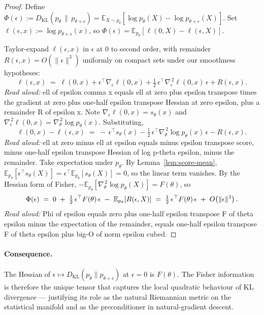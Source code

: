 \documentclass[11pt]{article}
\begin{document}
\begin{proof}
Define $\Phi(\epsilon) := D_{\mathrm{KL}}(p_\theta \,\|\, p_{\theta + \epsilon})
  = \mathbb{E}_{X \sim p_\theta}\!\left[\log p_\theta(X) - \log p_{\theta+\epsilon}(X)\right].$
Set $\ell(\epsilon, x) := \log p_{\theta + \epsilon}(x)$, so
$\Phi(\epsilon) = \mathbb{E}_{p_\theta}[\ell(0, X) - \ell(\epsilon, X)]$.

Taylor-expand $\ell(\epsilon, x)$ in $\epsilon$ at $0$ to second order, with
remainder $R(\epsilon, x) = O(\|\epsilon\|^3)$ uniformly on compact sets under
our smoothness hypotheses:
\[
\ell(\epsilon, x)
  \;=\; \ell(0, x)
  + \epsilon^\top \nabla_\epsilon \ell(0,x)
  + \tfrac{1}{2}\, \epsilon^\top \nabla_\epsilon^{\,2} \ell(0, x)\, \epsilon
  + R(\epsilon, x).
\]
\emph{Read aloud:} ell of epsilon comma x equals ell at zero plus epsilon transpose times the gradient at zero plus one-half epsilon transpose Hessian at zero epsilon, plus a remainder R of epsilon x.
Note $\nabla_\epsilon \ell(0,x) = s_\theta(x)$ and
$\nabla_\epsilon^{\,2} \ell(0,x) = \nabla_\theta^{\,2} \log p_\theta(x)$.
Substituting,
\[
\ell(0,x) - \ell(\epsilon, x)
  \;=\; -\,\epsilon^\top s_\theta(x)
  - \tfrac{1}{2}\, \epsilon^\top \nabla_\theta^{\,2} \log p_\theta(x)\, \epsilon
  - R(\epsilon, x).
\]
\emph{Read aloud:} ell at zero minus ell at epsilon equals minus epsilon transpose score, minus one-half epsilon transpose Hessian of log p-theta epsilon, minus the remainder.
Take expectation under $p_\theta$. By Lemma~\ref{lem:score-mean},
$\mathbb{E}_{p_\theta}[\epsilon^\top s_\theta(X)] = \epsilon^\top \mathbb{E}_{p_\theta}[s_\theta(X)] = 0$,
so the linear term vanishes. By the Hessian form of Fisher,
$-\mathbb{E}_{p_\theta}[\nabla_\theta^{\,2} \log p_\theta(X)] = F(\theta)$, so
\[
\Phi(\epsilon)
  \;=\; 0 \;+\; \tfrac{1}{2}\, \epsilon^\top F(\theta)\, \epsilon
  \;-\; \mathbb{E}_{p_\theta}[R(\epsilon, X)]
  \;=\; \tfrac{1}{2}\, \epsilon^\top F(\theta)\, \epsilon \;+\; O\!\left(\|\epsilon\|^3\right). \qedhere
\]
\emph{Read aloud:} Phi of epsilon equals zero plus one-half epsilon transpose F of theta epsilon minus the expectation of the remainder, equals one-half epsilon transpose F of theta epsilon plus big-O of norm epsilon cubed.
\end{proof}

\paragraph{Consequence.} The Hessian of $\epsilon \mapsto
D_{\mathrm{KL}}(p_\theta \| p_{\theta+\epsilon})$ at $\epsilon = 0$ is
$F(\theta)$. The Fisher information is therefore the unique tensor that
captures the local quadratic behaviour of KL divergence — justifying its role
as the natural Riemannian metric on the statistical manifold and as the
preconditioner in natural-gradient descent.
\end{document}
